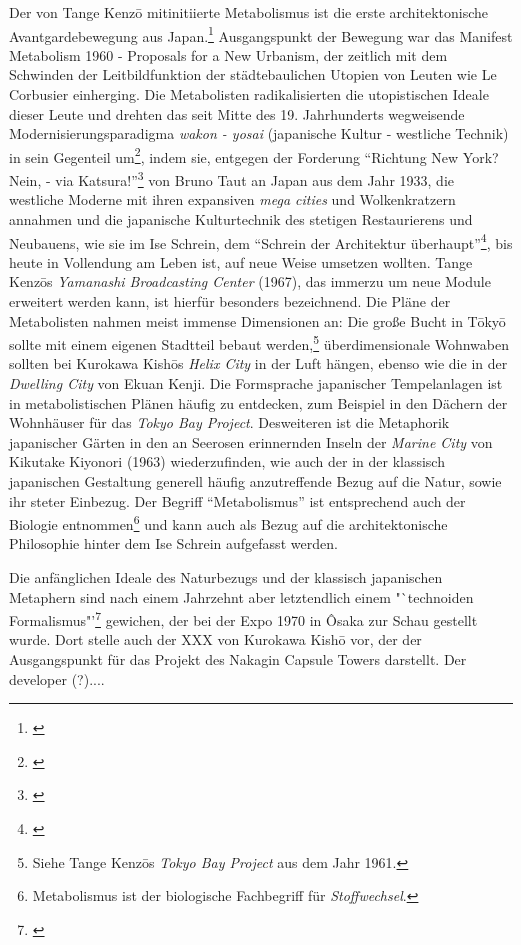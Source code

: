 \documentclass[a4paper, 12pt]{article}
\begin{document}
\begin{onehalfspace}
Der von Tange Kenzō mitinitiierte Metabolismus ist die erste architektonische Avantgardebewegung aus Japan.\footnote{\Cite[Vgl.][S. 243]{gleiter}} Ausgangspunkt der Bewegung war das Manifest Metabolism 1960 - Proposals for a New Urbanism, der zeitlich mit dem Schwinden der Leitbildfunktion der städtebaulichen Utopien von Leuten wie Le Corbusier einherging. Die Metabolisten radikalisierten die utopistischen Ideale dieser Leute und drehten das seit Mitte des 19. Jahrhunderts wegweisende Modernisierungsparadigma \emph{wakon - yosai} (japanische Kultur - westliche Technik) in sein Gegenteil um\footnote{\Cite[Vgl.][S. 243]{gleiter}}, indem sie, entgegen der Forderung "`Richtung New York? Nein, - via Katsura!"'\footnote{\Cite[Vgl.][S. 2]{taut}} von Bruno Taut an Japan aus dem Jahr 1933, die westliche Moderne mit ihren expansiven \emph{mega cities} und Wolkenkratzern annahmen und die japanische Kulturtechnik des stetigen Restaurierens und Neubauens, wie sie im Ise Schrein, dem "`Schrein der Architektur überhaupt"'\footnote{\Cite[Siehe][S. 19]{taut}}, bis heute in Vollendung am Leben ist, auf neue Weise umsetzen wollten. Tange Kenzōs \emph{Yamanashi Broadcasting Center} (1967), das immerzu um neue Module erweitert werden kann, ist hierfür besonders bezeichnend. Die Pläne der Metabolisten nahmen meist immense Dimensionen an: Die große Bucht in Tōkyō sollte mit einem eigenen Stadtteil bebaut werden,\footnote{Siehe Tange Kenzōs \emph{Tokyo Bay Project} aus dem Jahr 1961.} überdimensionale Wohnwaben sollten bei Kurokawa Kishōs \emph{Helix City} in der Luft hängen, ebenso wie die in der \emph{Dwelling City} von Ekuan Kenji. Die Formsprache japanischer Tempelanlagen ist in metabolistischen Plänen häufig zu entdecken, zum Beispiel in den Dächern der Wohnhäuser für das \emph{Tokyo Bay Project}. Desweiteren ist die Metaphorik japanischer Gärten in den an Seerosen erinnernden Inseln der \emph{Marine City} von Kikutake Kiyonori (1963) wiederzufinden, wie auch der in der klassisch japanischen Gestaltung generell häufig anzutreffende Bezug auf die Natur, sowie ihr steter Einbezug. Der Begriff "`Metabolismus"' ist entsprechend auch der Biologie entnommen\footnote{Metabolismus ist der biologische Fachbegriff für \emph{Stoffwechsel}.} und kann auch als Bezug auf die architektonische Philosophie hinter dem Ise Schrein aufgefasst werden. 

Die anfänglichen Ideale des Naturbezugs und der klassisch japanischen Metaphern sind nach einem Jahrzehnt aber letztendlich einem "`technoiden Formalismus"’\footnote{\Cite[Siehe][S. 246]{gleiter}} gewichen, der bei der Expo 1970 in Ôsaka zur Schau gestellt wurde. Dort stelle auch der XXX von Kurokawa Kishō vor, der der Ausgangspunkt für das Projekt des Nakagin Capsule Towers darstellt. Der developer (?).... 


\end{onehalfspace}
\end{document}
